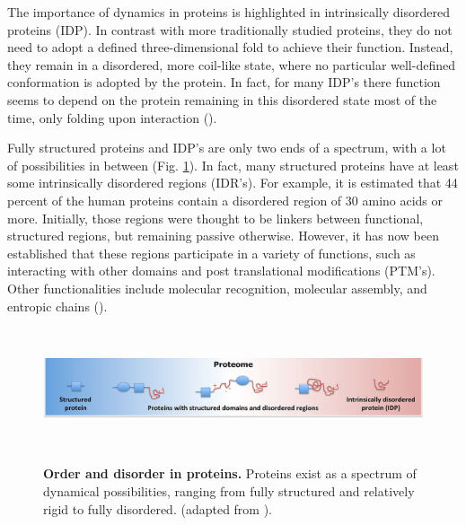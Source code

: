 The importance of dynamics in proteins is highlighted in intrinsically disordered proteins (IDP).
In contrast with more traditionally studied proteins,
they do not need to adopt a defined three-dimensional fold to achieve their function.
Instead, they remain in a disordered, more coil-like state,
where no particular well-defined conformation is adopted by the protein.
In fact, for many IDP's there function seems to depend on the protein remaining in this disordered state most of the time,
only folding upon interaction
(\cite{van2014}).

Fully structured proteins and IDP's are only two ends of a spectrum, 
with a lot of possibilities in between (Fig. \ref{fig:structure_disorder}).
In fact, many structured proteins have at least some intrinsically disordered regions (IDR's).
For example,
it is estimated that 44 percent of the human proteins contain a disordered region of 30 amino acids or more.
Initially, those regions were thought to be linkers between functional, structured regions, but remaining passive otherwise.
However, it has now been established that these regions participate in a variety of functions,
such as interacting with other domains and post translational modifications (PTM's).
Other functionalities include molecular recognition,
molecular assembly,
and entropic chains
(\cite{van2014}).

~\begin{figure}[h!]
	\includegraphics[width=\linewidth]{./literature_review/proteins/dynamics/img/protein_classes.jpeg}
	\caption{
	\textbf{Order and disorder in proteins.}
Proteins exist as a spectrum of dynamical possibilities,
ranging from fully structured and relatively rigid 
to fully disordered.
(adapted from \cite{van2014}).
}
	\label{fig:structure_disorder}
~\end{figure}
